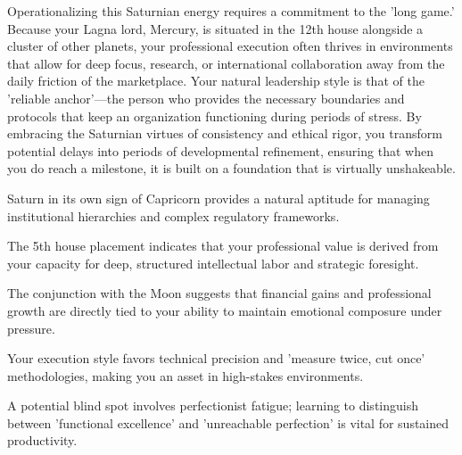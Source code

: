 {\fontsize{9}{13}\selectfont Operationalizing this Saturnian energy requires a commitment to the 'long game.' Because your Lagna lord, Mercury, is situated in the 12th house alongside a cluster of other planets, your professional execution often thrives in environments that allow for deep focus, research, or international collaboration away from the daily friction of the marketplace. Your natural leadership style is that of the 'reliable anchor'---the person who provides the necessary boundaries and protocols that keep an organization functioning during periods of stress. By embracing the Saturnian virtues of consistency and ethical rigor, you transform potential delays into periods of developmental refinement, ensuring that when you do reach a milestone, it is built on a foundation that is virtually unshakeable.}\par\vspace{1.8mm}

\begin{diamondlist}
  \item {\fontsize{8.5}{12}\selectfont Saturn in its own sign of Capricorn provides a natural aptitude for managing institutional hierarchies and complex regulatory frameworks.}
  \item {\fontsize{8.5}{12}\selectfont The 5th house placement indicates that your professional value is derived from your capacity for deep, structured intellectual labor and strategic foresight.}
  \item {\fontsize{8.5}{12}\selectfont The conjunction with the Moon suggests that financial gains and professional growth are directly tied to your ability to maintain emotional composure under pressure.}
  \item {\fontsize{8.5}{12}\selectfont Your execution style favors technical precision and 'measure twice, cut once' methodologies, making you an asset in high-stakes environments.}
  \item {\fontsize{8.5}{12}\selectfont A potential blind spot involves perfectionist fatigue; learning to distinguish between 'functional excellence' and 'unreachable perfection' is vital for sustained productivity.}
\end{diamondlist}


